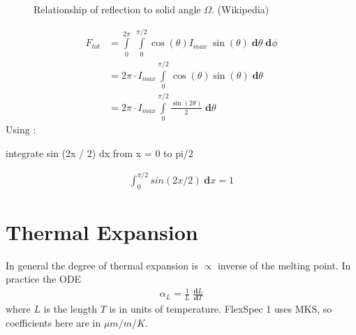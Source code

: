 \documentclass[letterpaper,10pt,english,openany,oneside]{sphinxmanual}
\begin{document}
\begin{figure}[htbp]
\centering
\capstart

\noindent{}
\caption{Relationship of reflection to solid angle \(\Omega\). (Wikipedia)}\label{\detokenize{physics:id7}}\end{figure}
\begin{equation}\label{equation:physics:Lambert-1}
\begin{split}F_{tot} &= \int\limits_0^{2\pi}\;\int\limits_0^{\pi/2}\cos(\theta)I_{max}\; \sin(\theta)\;\mathbf{d}\theta\;\mathbf{d}\phi \\
&= 2\pi\cdot I_{max}\int\limits_0^{\pi/2}\cos(\theta)\sin(\theta)\;\mathbf{d}\theta \\
&= 2\pi\cdot I_{max}\int\limits_0^{\pi/2}\frac{\sin(2\theta)}{2}\;\mathbf{d}\theta\end{split}
\end{equation}
\sphinxAtStartPar
Using  :

\begin{sphinxVerbatim}[commandchars=\\\{\}]
integrate sin (2x / 2) dx from x = 0 to pi/2
\end{sphinxVerbatim}
\begin{equation*}
\begin{split}\int_0^{\pi/2} sin (2x / 2)\; \mathbf{d}x = 1\end{split}
\end{equation*}

\section{Thermal Expansion}
\label{\detokenize{physics:thermal-expansion}}
\sphinxAtStartPar
In general the degree of thermal expansion is \(\propto\) inverse
of the melting point. In practice the ODE
\begin{equation}\label{equation:physics:ThermalExpansionODE}
\begin{split}\alpha_{L} = \frac{1}{L}\; \frac{\mathbf{d}L}{\mathbf{d}T}\end{split}
\end{equation}
\sphinxAtStartPar
where \(L\) is the length \(T\) is in units of temperature.
FlexSpec 1 uses MKS, so coefficients here are in \(\mu{m}/m/K\).
\end{document}
